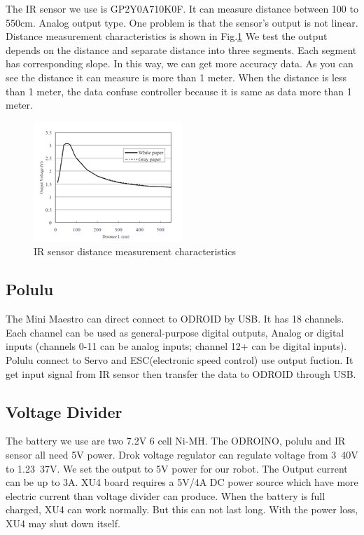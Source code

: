 \documentclass[a4paper, 10pt, conference]{ieeeconf}      %
\begin{document}
The IR sensor we use is GP2Y0A710K0F. It can measure distance between 100 to 550cm. Analog output type. One problem is that the sensor’s output is not linear. Distance measurement characteristics is shown in Fig.\ref{ir fig} We test the output depends on the distance and separate distance into three segments. Each segment has corresponding slope. In this way, we can get more accuracy data. As you can see the distance it can measure is more than 1 meter. When the distance is less than 1 meter, the data confuse controller because it is same as data more than 1 meter.
\begin{figure}
    \centering
    \includegraphics{IR.png}
    \caption{IR sensor distance measurement characteristics}
    \label{ir fig}
\end{figure}

\subsection{Polulu}
The Mini Maestro can direct connect to ODROID by USB. It has 18 channels. Each channel can be used as general-purpose digital outputs, Analog or digital inputs (channels 0-11 can be analog inputs; channel 12+ can be digital inputs). Polulu connect to Servo and ESC(electronic speed control) use output fuction. It get input signal from IR sensor then transfer the data to ODROID through USB.

\subsection{Voltage Divider}
The battery we use are two 7.2V 6 cell Ni-MH. The ODROINO, polulu and IR sensor all need 5V power. Drok voltage regulator can regulate voltage from 3~40V to 1.23~37V. We set the output to 5V power for our robot. The Output current can be up to 3A. XU4 board requires a 5V/4A DC power source which have more electric current than voltage divider can produce. When the battery is full charged, XU4 can work normally. But this can not last long. With the power loss, XU4 may shut down itself.
\end{document}

